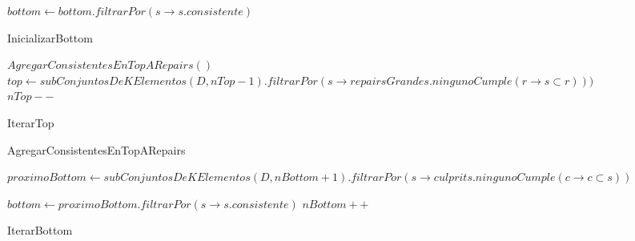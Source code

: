 \documentclass[11pt,a4paper,twoside]{tesis}
\begin{document}
\begin{figure}
\begin{algorithm}[H]
\SetAlgoLined

$bottom \gets bottom.filtrarPor(s \rightarrow s.consistente )$

 \caption{InicializarBottom}
\end{algorithm}



\begin{algorithm}[H]
\SetAlgoLined
$AgregarConsistentesEnTopARepairs()$\;
$top \gets subConjuntosDeKElementos(D, nTop - 1).filtrarPor(s \rightarrow repairsGrandes.ningunoCumple(r \rightarrow s \subset r) ))$\;	
$nTop--$\;		
\caption{IterarTop}
 
 
\end{algorithm}
\end{figure}
\begin{figure}
\begin{algorithm}[H]
\SetAlgoLined
{}
\caption{AgregarConsistentesEnTopARepairs}
 
 
\end{algorithm}

\begin{algorithm}[H]
\SetAlgoLined


 $proximoBottom \gets subConjuntosDeKElementos(D, nBottom + 1).filtrarPor(s \rightarrow culprits.ningunoCumple(c \rightarrow c \subset s))$\;

$bottom \gets proximoBottom.filtrarPor(s \rightarrow s.consistente)$\;
$nBottom++$\;
 \caption{IterarBottom}

\end{algorithm}
\end{figure}
\end{document}
